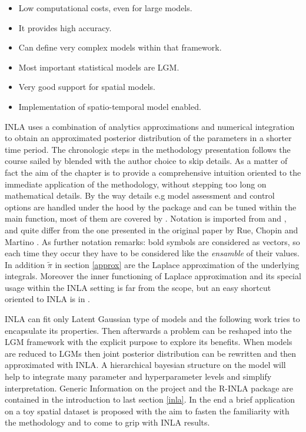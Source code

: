 \documentclass[
  12pt,
  a4paper,
  oneside]{book}
\providecommand{\tightlist}{%
  \setlength{\itemsep}{0pt}\setlength{\parskip}{0pt}}
\theoremstyle{definition}
\theoremstyle{definition}
\theoremstyle{definition}
\theoremstyle{remark}
\begin{document}
\begin{itemize}
\tightlist
\item
  Low computational costs, even for large models.
\item
  It provides high accuracy.
\item
  Can define very complex models within that framework.
\item
  Most important statistical models are LGM.
\item
  Very good support for spatial models.
\item
  Implementation of spatio-temporal model enabled.
\end{itemize}

INLA uses a combination of analytics approximations and numerical integration to obtain an approximated posterior distribution of the parameters in a shorter time period.
The chronologic steps in the methodology presentation follows the course sailed by \citet{Moraga2019} blended with the author choice to skip details. As a matter of fact the aim of the chapter is to provide a comprehensive intuition oriented to the immediate application of the methodology, without stepping too long on mathematical details. By the way details e.g model assessment and control options are handled under the hood by the package and can be tuned within the main function, most of them are covered by \citet{Bayesian_INLA_Rubio}. Notation is imported from \citet{Blangiardo-Cameletti} and \citet{Bayesian_INLA_Rubio}, and quite differ from the one presented in the original paper by Rue, Chopin and Martino \citeyearpar{Rue2009}. As further notation remarks: bold symbols are considered as vectors, so each time they occur they have to be considered like the \emph{ensamble} of their values. In addition \(\tilde\pi\) in section \ref{approx} are the Laplace approximation of the underlying integrals. Moreover the inner functioning of Laplace approximation and its special usage within the INLA setting is far from the scope, but an easy shortcut oriented to INLA is in \citet{Blangiardo-Cameletti}.

INLA can fit only Latent Gaussian type of models and the following work tries to encapsulate its properties. Then afterwards a problem can be reshaped into the LGM framework with the explicit purpose to explore its benefits. When models are reduced to LGMs then joint posterior distribution can be rewritten and then approximated with INLA. A hierarchical bayesian structure on the model will help to integrate many parameter and hyperparameter levels and simplify interpretation.
Generic Information on the project and the R-INLA package are contained in the introduction to last section \ref{inla}. In the end a brief application on a toy spatial dataset is proposed with the aim to fasten the familiarity with the methodology and to come to grip with INLA results.
\end{document}
